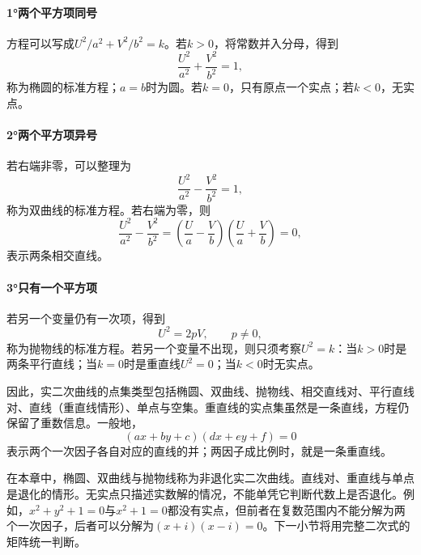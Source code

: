 \paragraph{1°两个平方项同号} \mbox{}

方程可以写成\(U^2/a^2+V^2/b^2=k\)。若\(k>0\)，将常数并入分母，得到
\begin{equation}\label{eq:quadratic-ellipse-standard}
    \frac{U^2}{a^2}+\frac{V^2}{b^2}=1 ,
\end{equation}
称为{\heiti{}椭圆}的标准方程；\(a=b\)时为圆。若\(k=0\)，只有原点一个实点；若\(k<0\)，无实点。

\paragraph{2°两个平方项异号} \mbox{}

若右端非零，可以整理为
\begin{equation}\label{eq:quadratic-hyperbola-standard}
    \frac{U^2}{a^2}-\frac{V^2}{b^2}=1 ,
\end{equation}
称为{\heiti{}双曲线}的标准方程。若右端为零，则
\begin{equation*}
    \frac{U^2}{a^2}-\frac{V^2}{b^2}
    =\left(\frac Ua-\frac Vb\right)\left(\frac Ua+\frac Vb\right)=0 ,
\end{equation*}
表示两条相交直线。

\paragraph{3°只有一个平方项} \mbox{}

若另一个变量仍有一次项，得到
\begin{equation}\label{eq:quadratic-parabola-standard}
    U^2=2pV , \qquad p\ne0 ,
\end{equation}
称为{\heiti{}抛物线}的标准方程。若另一个变量不出现，则只须考察\(U^2=k\)：当\(k>0\)时是两条平行直线；当\(k=0\)时是重直线\(U^2=0\)；当\(k<0\)时无实点。

因此，实二次曲线的点集类型包括椭圆、双曲线、抛物线、相交直线对、平行直线对、直线（重直线情形）、单点与空集。重直线的实点集虽然是一条直线，方程仍保留了重数信息。一般地，
\begin{equation*}
    (ax+by+c)(dx+ey+f)=0
\end{equation*}
表示两个一次因子各自对应的直线的并；两因子成比例时，就是一条重直线。

在本章中，椭圆、双曲线与抛物线称为{\heiti{}非退化实二次曲线}。直线对、重直线与单点是退化的情形。无实点只描述实数解的情况，不能单凭它判断代数上是否退化。例如，\(x^2+y^2+1=0\)与\(x^2+1=0\)都没有实点，但前者在复数范围内不能分解为两个一次因子，后者可以分解为\((x+i)(x-i)=0\)。下一小节将用完整二次式的矩阵统一判断。

